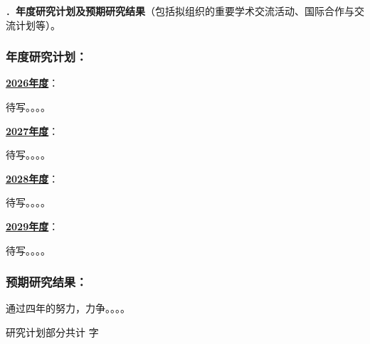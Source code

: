 {\sihao \color{MsBlue} ．{\bfseries 年度研究计划及预期研究结果}（包括拟组织的重要学术交流活动、国际合作与交流计划等）。}

\subsubsection{{\bfseries 年度研究计划：}}

\uline{\bfseries 2026年度}：

待写。。。。

\uline{\bfseries 2027年度}：

待写。。。。

\uline{\bfseries 2028年度}：

待写。。。。

\uline{\bfseries 2029年度}：

待写。。。。


\subsubsection{{\bfseries 预期研究结果：}}

通过四年的努力，力争。。。。


\ifhandout
\else
\begin{center}
{\larger[2]\color{red}  研究计划部分共计 \wordcount 字 }
\end{center}
\fi


\vskip 5mm
